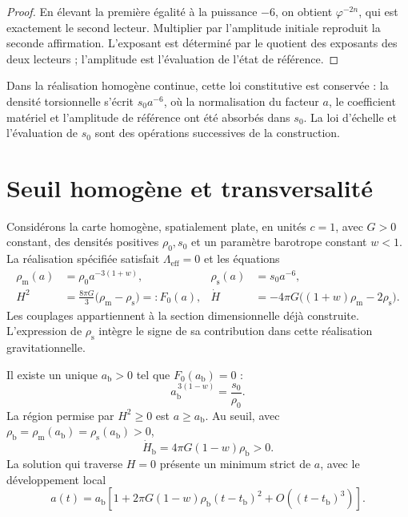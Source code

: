\begin{proof}
En élevant la première égalité à la puissance \(-6\), on obtient \(\varphi^{-2n}\), qui est exactement le second lecteur. Multiplier par l'amplitude initiale reproduit la seconde affirmation. L'exposant est déterminé par le quotient des exposants des deux lecteurs ; l'amplitude est l'évaluation de l'état de référence.
\end{proof}

Dans la réalisation homogène continue, cette loi constitutive est conservée :
la densité torsionnelle s'écrit \(s_0a^{-6}\), où la normalisation
du facteur \(a\), le coefficient matériel et l'amplitude de référence
ont été absorbés dans \(s_0\). La loi d'échelle et l'évaluation de
\(s_0\) sont des opérations successives de la construction.

\section{Seuil homogène et transversalité}
\label{x_reciprocidad:vii:sec:umbral-rebote}

Considérons la carte homogène, spatialement plate, en unités \(c=1\),
avec \(G>0\) constant, des densités positives \(\rho_0,s_0\) et un paramètre
barotrope constant \(w<1\). La réalisation spécifiée satisfait
\(\Lambda_{\mathrm{eff}}=0\) et les équations
\begin{align}
 \rho_{\mathrm m}(a)&=\rho_0a^{-3(1+w)},&
 \rho_{\mathrm s}(a)&=s_0a^{-6},\\
 H^2&=\frac{8\pi G}{3}
        \bigl(\rho_{\mathrm m}-\rho_{\mathrm s}\bigr)
        =:F_0(a),&
 \dot H&=-4\pi G
        \bigl((1+w)\rho_{\mathrm m}-2\rho_{\mathrm s}\bigr).
 \label{x_reciprocidad:vii:eq:dinamica-homogenea}
\end{align}
Les couplages appartiennent à la section dimensionnelle déjà construite.
L'expression de \(\rho_{\mathrm s}\) intègre le signe de sa contribution
dans cette réalisation gravitationnelle.

\begin{theorem}
\label{x_reciprocidad:vii:thm:rebote}
Il existe un unique \(a_{\mathrm b}>0\) tel que \(F_0(a_{\mathrm b})=0\) :
\[
 a_{\mathrm b}^{\,3(1-w)}=\frac{s_0}{\rho_0}.
\]
La région permise par \(H^2\geq0\) est \(a\geq a_{\mathrm b}\).
Au seuil, avec
\(\rho_{\mathrm b}=\rho_{\mathrm m}(a_{\mathrm b})
                  =\rho_{\mathrm s}(a_{\mathrm b})>0\),
\[
 \dot H_{\mathrm b}=4\pi G(1-w)\rho_{\mathrm b}>0.
\]
La solution qui traverse \(H=0\) présente un minimum strict de \(a\), avec le développement local
\[
 a(t)=a_{\mathrm b}\left[
 1+2\pi G(1-w)\rho_{\mathrm b}(t-t_{\mathrm b})^2
 +O((t-t_{\mathrm b})^3)\right].
\]
\end{theorem}

